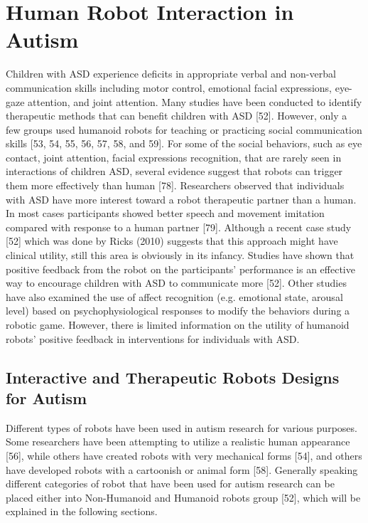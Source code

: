 \section{Human Robot Interaction in Autism}
Children with ASD experience deficits in appropriate verbal and non-verbal communication skills including motor control, emotional facial expressions, eye-gaze attention, and joint attention. Many studies have been conducted to identify therapeutic methods that can benefit children with ASD [52]. However, only a few groups used humanoid robots for teaching or practicing social communication skills [53, 54, 55, 56, 57, 58, and 59].
For some of the social behaviors, such as eye contact, joint attention, facial expressions recognition, that are rarely seen in interactions of children ASD, several evidence suggest that robots can trigger them more effectively than human [78]. Researchers observed that individuals with ASD have more interest toward a robot therapeutic partner than a human. In most cases participants showed better speech and movement imitation compared with response to a human partner [79]. Although a recent case study [52] which was done by Ricks (2010) suggests that this approach might have clinical utility, still this area is obviously in its infancy. Studies have shown that positive feedback from the robot on the participants’ performance is an effective way to encourage children with ASD to communicate more [52]. Other studies have also examined the use of affect recognition (e.g. emotional state, arousal level) based on psychophysiological responses to modify the behaviors during a robotic game. However, there is limited information on the utility of humanoid robots’ positive feedback in interventions for individuals with ASD.

\subsection{Interactive and Therapeutic Robots Designs for Autism}
Different types of robots have been used in autism research for various purposes. Some researchers have been attempting to utilize a realistic human appearance [56], while others have created robots with very mechanical forms [54], and others have developed robots with a cartoonish or animal form [58]. Generally speaking different categories of robot that have been used for autism research can be placed either into Non-Humanoid and Humanoid robots group [52], which will be explained in the following sections.

